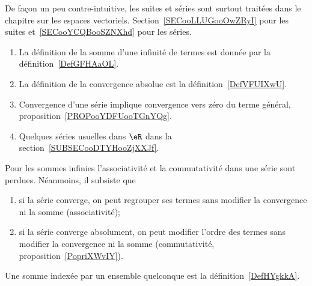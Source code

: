
De façon un peu contre-intuitive, les suites et séries sont surtout traitées dans le chapitre sur les espaces vectoriels. Section~\ref{SECooLLUGooOwZRyI} pour les suites et~\ref{SECooYCQBooSZNXhd} pour les séries.

\begin{enumerate}
    \item
        La définition de la somme d'une infinité de termes est donnée par la définition~\ref{DefGFHAaOL}.
    \item
        La définition de la convergence absolue est la définition~\ref{DefVFUIXwU}.
    \item
        Convergence d'une série implique convergence vers zéro du terme général, proposition~\ref{PROPooYDFUooTGnYQg}.
    \item
        Quelques séries usuelles dans \( \eR\) dans la section~\ref{SUBSECooDTYHooZjXXJf}.
\end{enumerate}

    Pour les sommes infinies l'associativité et la commutativité dans une série sont perdues. Néanmoins, il subsiste que
  \begin{enumerate}
  \item
      si la série converge, on peut regrouper ses termes sans modifier la convergence ni la somme (associativité);
  \item
      si la série converge absolument, on peut modifier l'ordre des termes sans modifier la convergence ni la somme (commutativité, proposition~\ref{PopriXWvIY}).
  \end{enumerate}

Une somme indexée par un ensemble quelconque est la définition~\ref{DefHYgkkA}.

